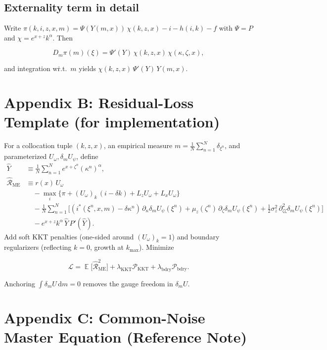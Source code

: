 ﻿\documentclass[11pt,letterpaper,oneside]{article}
\numberwithin{equation}{section}
\DeclareMathOperator{\E}{\mathbb{E}}
\newcommand{\1}{\mathbf{1}}
\newcommand{\diff}{\mathrm{d}}
\newcommand{\Lz}{L_z}
\newcommand{\Lx}{L_x}
\newcommand{\dmU}{\delta_m U}
\newcommand{\Dm}{D_m}
\begin{document}
\subsection{Externality term in detail}
Write $\pi(k,i,z,x,m)=\Psi(Y(m,x))\,\chi(k,z,x)-i-h(i,k)-f$ with $\Psi=P$ and $\chi=e^{x+z}k^\alpha$. Then

$$
\Dm\pi(m)(\xi)=\Psi'(Y)\,\chi(k,z,x)\,\chi(\kappa,\zeta,x),
$$

and integration w\.r.t.\ $m$ yields $\chi(k,z,x)\,\Psi'(Y)\,Y(m,x)$.

\section{Appendix B: Residual-Loss Template (for implementation)}\label{app:loss}

For a collocation tuple $(k,z,x)$, an empirical measure $m=\tfrac1N\sum_{n=1}^N \delta_{\xi^n}$, and parameterized $U_\omega,\dmU_\psi$, define
\begin{align*}
\widehat{Y} &\equiv \frac{1}{N}\sum_{n=1}^N e^{x+\zeta^n}(\kappa^n)^\alpha,\\
\widehat{\mathcal{R}}_{\mathrm{ME}} &\equiv r(x)\,U_\omega\\
  &\quad - \max_{i}\Big\{ \pi + (U_{\omega})_k\,(i-\delta k) + \Lz U_{\omega} + \Lx U_{\omega} \Big\} \\
  &\quad - \frac{1}{N}\sum_{n=1}^N \Big[ (i^*(\xi^n,x,m)-\delta\kappa^n)\,\partial_{\kappa}\dmU_{\psi}(\xi^n)
    + \mu_z(\zeta^n)\,\partial_{\zeta}\dmU_{\psi}(\xi^n)
    + \tfrac12 \sigma_z^2\,\partial^2_{\zeta\zeta}\dmU_{\psi}(\xi^n) \Big] \\
  &\quad - e^{x+z}k^{\alpha}\,\widehat{Y}\,P'(\widehat{Y}).
  \end{align*}
  Add soft KKT penalties (one-sided around $(U_\omega)_k=1$) and boundary regularizers (reflecting $k=0$, growth at $k_{\max}$). Minimize

$$
\mathcal{L}=\E\big[\widehat{\mathcal{R}}_{\mathrm{ME}}^2\big]+\lambda_{\mathrm{KKT}}\mathcal{P}_{\mathrm{KKT}}
+\lambda_{\mathrm{bdry}}\mathcal{P}_{\mathrm{bdry}}.
$$

Anchoring $\int \dmU\,\diff m=0$ removes the gauge freedom in $\dmU$.

\section{Appendix C: Common-Noise Master Equation (Reference Note)}\label{app:common-noise}
\end{document}
